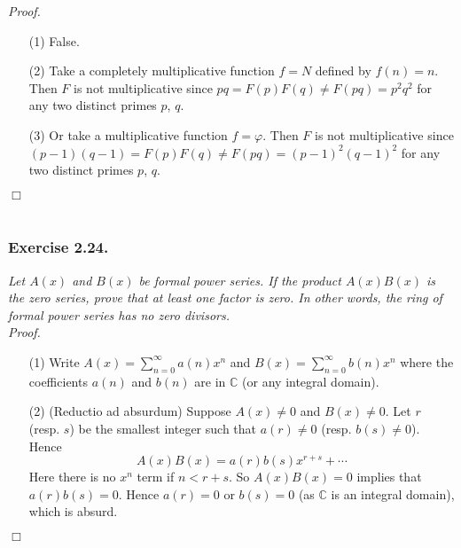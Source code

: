 \documentclass{article}
\begin{document}
\emph{Proof.}
\begin{enumerate}
\item[(1)]
  False.

\item[(2)]
  Take a completely multiplicative function $f = N$ defined by $f(n) = n$.
  Then $F$ is not multiplicative since $pq = F(p) F(q) \neq F(pq) = p^2q^2$
  for any two distinct primes $p$, $q$.

\item[(3)]
  Or take a multiplicative function $f = \varphi$.
  Then $F$ is not multiplicative since $(p-1)(q-1) = F(p) F(q) \neq F(pq) = (p-1)^2(q-1)^2$
  for any two distinct primes $p$, $q$.
\end{enumerate}
$\Box$ \\\\






\subsubsection*{Exercise 2.24.}
\emph{Let $A(x)$ and $B(x)$ be formal power series.
If the product $A(x)B(x)$ is the zero series, prove that at least one factor is zero.
In other words, the ring of formal power series has no zero divisors.} \\



\emph{Proof.}
\begin{enumerate}
\item[(1)]
  Write $A(x) = \sum_{n=0}^{\infty} a(n) x^n$
  and $B(x) = \sum_{n=0}^{\infty} b(n) x^n$
  where the coefficients $a(n)$ and $b(n)$ are in $\mathbb{C}$ (or any integral domain).

\item[(2)]
  (Reductio ad absurdum)
  Suppose $A(x) \neq 0$ and $B(x) \neq 0$.
  Let $r$ (resp. $s$) be the smallest integer such that $a(r) \neq 0$ (resp. $b(s) \neq 0$).
  Hence
  \[
    A(x)B(x)
    = a(r)b(s) x^{r+s} + \cdots
  \]
  Here there is no $x^n$ term if $n < r+s$.
  So $A(x)B(x) = 0$ implies that $a(r)b(s) = 0$.
  Hence $a(r) = 0$ or $b(s) = 0$ (as $\mathbb{C}$ is an integral domain), which is absurd.
\end{enumerate}
$\Box$ \\\\
\end{document}
